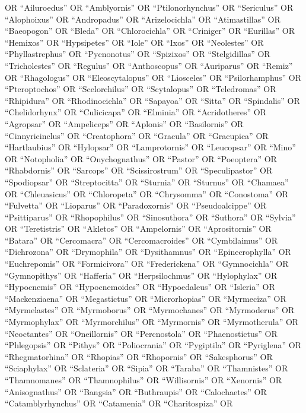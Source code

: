 \documentclass[
  number,
  review,
  onecolumn]{elsarticle}
\begin{document}
OR ``Ailuroedus'' OR ``Amblyornis'' OR ``Ptilonorhynchus'' OR
``Sericulus'' OR ``Alophoixus'' OR ``Andropadus'' OR ``Arizelocichla''
OR ``Atimastillas'' OR ``Baeopogon'' OR ``Bleda'' OR ``Chlorocichla'' OR
``Criniger'' OR ``Eurillas'' OR ``Hemixos'' OR ``Hypsipetes'' OR
``Iole'' OR ``Ixos'' OR ``Neolestes'' OR ``Phyllastrephus'' OR
``Pycnonotus'' OR ``Spizixos'' OR ``Stelgidillas'' OR ``Tricholestes''
OR ``Regulus'' OR ``Anthoscopus'' OR ``Auriparus'' OR ``Remiz'' OR
``Rhagologus'' OR ``Eleoscytalopus'' OR ``Liosceles'' OR
``Psilorhamphus'' OR ``Pteroptochos'' OR ``Scelorchilus'' OR
``Scytalopus'' OR ``Teledromas'' OR ``Rhipidura'' OR ``Rhodinocichla''
OR ``Sapayoa'' OR ``Sitta'' OR ``Spindalis'' OR ``Chelidorhynx'' OR
``Culicicapa'' OR ``Elminia'' OR ``Acridotheres'' OR ``Agropsar'' OR
``Ampeliceps'' OR ``Aplonis'' OR ``Basilornis'' OR ``Cinnyricinclus'' OR
``Creatophora'' OR ``Gracula'' OR ``Gracupica'' OR ``Hartlaubius'' OR
``Hylopsar'' OR ``Lamprotornis'' OR ``Leucopsar'' OR ``Mino'' OR
``Notopholia'' OR ``Onychognathus'' OR ``Pastor'' OR ``Poeoptera'' OR
``Rhabdornis'' OR ``Sarcops'' OR ``Scissirostrum'' OR ``Speculipastor''
OR ``Spodiopsar'' OR ``Streptocitta'' OR ``Sturnia'' OR ``Sturnus'' OR
``Chamaea'' OR ``Chleuasicus'' OR ``Chloropeta'' OR ``Chrysomma'' OR
``Conostoma'' OR ``Fulvetta'' OR ``Lioparus'' OR ``Paradoxornis'' OR
``Pseudoalcippe'' OR ``Psittiparus'' OR ``Rhopophilus'' OR
``Sinosuthora'' OR ``Suthora'' OR ``Sylvia'' OR ``Teretistris'' OR
``Akletos'' OR ``Ampelornis'' OR ``Aprositornis'' OR ``Batara'' OR
``Cercomacra'' OR ``Cercomacroides'' OR ``Cymbilaimus'' OR
``Dichrozona'' OR ``Drymophila'' OR ``Dysithamnus'' OR
``Epinecrophylla'' OR ``Euchrepomis'' OR ``Formicivora'' OR
``Frederickena'' OR ``Gymnocichla'' OR ``Gymnopithys'' OR ``Hafferia''
OR ``Herpsilochmus'' OR ``Hylophylax'' OR ``Hypocnemis'' OR
``Hypocnemoides'' OR ``Hypoedaleus'' OR ``Isleria'' OR ``Mackenziaena''
OR ``Megastictus'' OR ``Microrhopias'' OR ``Myrmeciza'' OR
``Myrmelastes'' OR ``Myrmoborus'' OR ``Myrmochanes'' OR ``Myrmoderus''
OR ``Myrmophylax'' OR ``Myrmorchilus'' OR ``Myrmornis'' OR
``Myrmotherula'' OR ``Neoctantes'' OR ``Oneillornis'' OR ``Percnostola''
OR ``Phaenostictus'' OR ``Phlegopsis'' OR ``Pithys'' OR ``Poliocrania''
OR ``Pygiptila'' OR ``Pyriglena'' OR ``Rhegmatorhina'' OR ``Rhopias'' OR
``Rhopornis'' OR ``Sakesphorus'' OR ``Sciaphylax'' OR ``Sclateria'' OR
``Sipia'' OR ``Taraba'' OR ``Thamnistes'' OR ``Thamnomanes'' OR
``Thamnophilus'' OR ``Willisornis'' OR ``Xenornis'' OR ``Anisognathus''
OR ``Bangsia'' OR ``Buthraupis'' OR ``Calochaetes'' OR
``Catamblyrhynchus'' OR ``Catamenia'' OR ``Charitospiza'' OR
\end{document}
